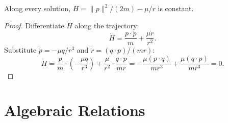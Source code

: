 \begin{theorem}\label{thm:energy-const}
Along every solution, $H = \|p\|^2/(2m) - \mu/r$ is constant.
\leanok
\begin{proof}
Differentiate $H$ along the trajectory:
\[
  \dot H = \frac{p \cdot \dot p}{m} + \frac{\mu \dot r}{r^2}.
\]
Substitute $\dot p = -\mu q/r^3$ and $\dot r = (q \cdot p)/(mr)$:
\[
  \dot H
  = \frac{p}{m} \cdot \!\left(-\frac{\mu q}{r^3}\right) + \frac{\mu}{r^2} \cdot \frac{q \cdot p}{mr}
  = -\frac{\mu(p \cdot q)}{mr^3} + \frac{\mu(q \cdot p)}{mr^3}
  = 0.
\]
\end{proof}
\end{theorem}

\section{Algebraic Relations}

